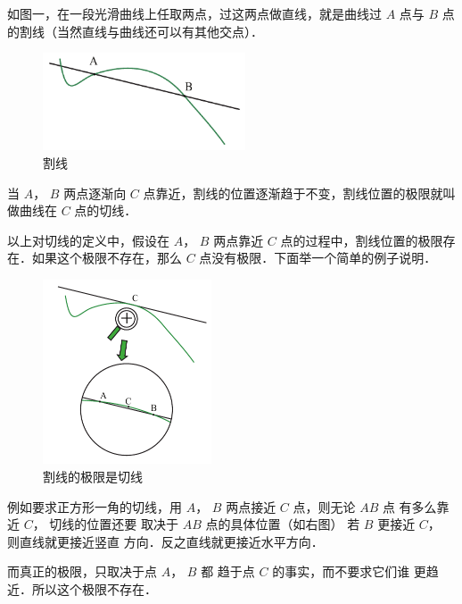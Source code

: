 

如图一，在一段光滑曲线上任取两点，过这两点做直线，就是曲线过 $A$ 点与 $B$ 点的割线（当然直线与曲线还可以有其他交点）．
\begin{figure}[ht]
\centering
\includegraphics[width=6cm]{./figures/TanL1.pdf}
\caption{割线}
\end{figure}
当 $A$，  $B$ 两点逐渐向 $C$ 点靠近，割线的位置逐渐趋于不变，割线位置的极限就叫做曲线在 $C$ 点的切线．

以上对切线的定义中，假设在 $A$，  $B$ 两点靠近 $C$ 点的过程中，割线位置的极限存在．如果这个极限不存在，那么 $C$ 点没有极限．下面举一个简单的例子说明．

\begin{figure}[ht]
\vskip 0pt
\centering
\includegraphics[width=5cm]{./figures/TanL2.pdf}
\caption{割线的极限是切线}
\end{figure}
例如要求正方形一角的切线，用
 $A$，  $B$ 两点接近 $C$ 点，则无论 $AB$ 点
有多么靠近 $C$， 切线的位置还要
取决于 $AB$ 点的具体位置（如右图）
若 $B$ 更接近 $C$， 则直线就更接近竖直
方向．反之直线就更接近水平方向．


而真正的极限，只取决于点 $A$，  $B$ 都
趋于点 $C$ 的事实，而不要求它们谁
更趋近．所以这个极限不存在．















